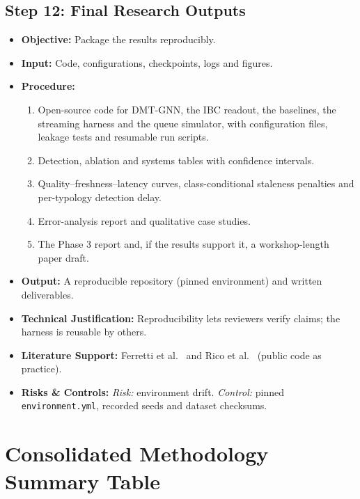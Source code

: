 \documentclass[11pt,a4paper]{article}
\begin{document}
\subsection{Step 12: Final Research Outputs}
\begin{itemize}[leftmargin=*]
    \item \textbf{Objective:} Package the results reproducibly.
    \item \textbf{Input:} Code, configurations, checkpoints, logs and figures.
    \item \textbf{Procedure:}
    \begin{enumerate}[leftmargin=*]
        \item Open-source code for DMT-GNN, the IBC readout, the baselines, the streaming harness and the queue simulator, with configuration files, leakage tests and resumable run scripts.
        \item Detection, ablation and systems tables with confidence intervals.
        \item Quality--freshness--latency curves, class-conditional staleness penalties and per-typology detection delay.
        \item Error-analysis report and qualitative case studies.
        \item The Phase 3 report and, if the results support it, a workshop-length paper draft.
    \end{enumerate}
    \item \textbf{Output:} A reproducible repository (pinned environment) and written deliverables.
    \item \textbf{Technical Justification:} Reproducibility lets reviewers verify claims; the harness is reusable by others.
    \item \textbf{Literature Support:} Ferretti et al.\ \cite{ferretti2025aml} and Rico et al.\ \cite{rico2026taml} (public code as practice).
    \item \textbf{Risks \& Controls:} \textit{Risk:} environment drift. \textit{Control:} pinned \texttt{environment.yml}, recorded seeds and dataset checksums.
\end{itemize}

\section{Consolidated Methodology Summary Table}
\label{sec:methodology_summary_table}
\end{document}
